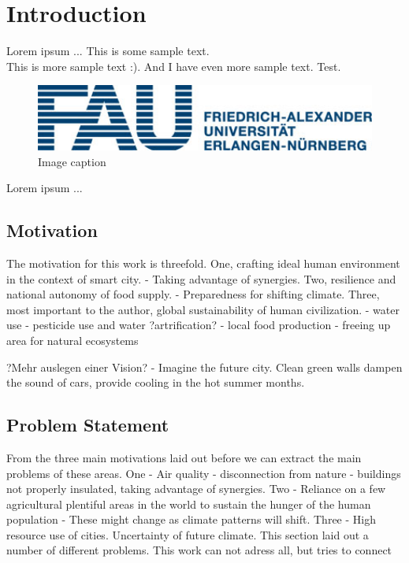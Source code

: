 \chapter{Introduction}
\label{chap:Introduction}

Lorem ipsum ...
This is some sample text.\\
This is more sample text :).
And I have even more sample text.
Test.
%
\begin{figure}[H]
	\centering
	\includegraphics[width=1\textwidth]{img/FAU}
	\caption{Image caption}
	\label{Image_Label}
\end{figure}
%
\noindent
%
Lorem ipsum ...

\section{Motivation}
\label{sec:Motivation}
The motivation for this work is threefold.
One, crafting ideal human environment in the context of smart city.
- Taking advantage of synergies.
Two, resilience and national autonomy of food supply.
- Preparedness for shifting climate.
Three, most important to the author, global sustainability of human civilization.
- water use - pesticide use and water ?artrification? - local food production - freeing up area for natural ecosystems

?Mehr auslegen einer Vision? - Imagine the future city. Clean green walls dampen the sound of cars, provide cooling in the hot summer months. %



\section{Problem Statement}
From the three main motivations laid out before we can extract the main problems of these areas.
One - Air quality - disconnection from nature - buildings not properly insulated, taking advantage of synergies. 
Two - Reliance on a few agricultural plentiful areas in the world to sustain the hunger of the human population - These might change as climate patterns will shift.
Three - 
High resource use of cities.
Uncertainty of future climate.
This section laid out a number of different problems. This work can not adress all, but tries to connect 

